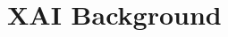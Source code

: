 \documentclass[12pt,a4paper,openright,twoside]{book}
\begin{document}



\section{XAI Background}\label{sec:background}
\end{document}
